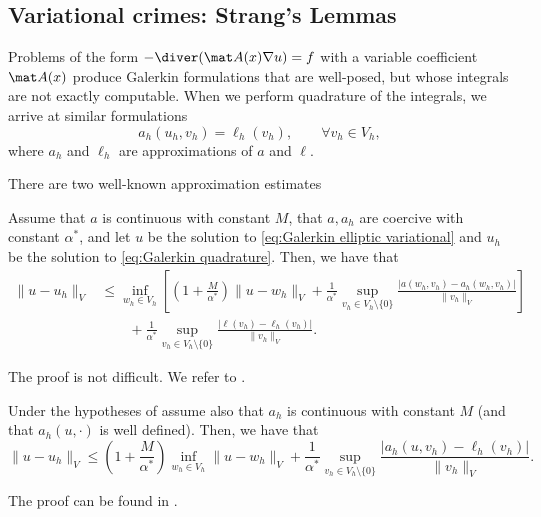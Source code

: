\subsection{Variational crimes: Strang's Lemmas}

Problems of the form $-\diver(\mat A(x)\nabla u)= f$ with a variable coefficient $\mat A(x)$ produce Galerkin formulations that are well-posed, but whose integrals are not exactly computable.
When we perform quadrature of the integrals, we arrive at similar formulations
\begin{equation}
    \label{eq:Galerkin quadrature}
    a_h(u_h,v_h) = \ell_h(v_h), \qquad \forall v_h \in V_h,
\end{equation}
where $a_h$ and $\ell_h$ are approximations of $a$ and $\ell$.

There are two well-known approximation estimates
\begin{lemma}
    \label{lem:Strang first lemma}
    Assume that $a$ is continuous with constant $M$, that $a, a_h$ are coercive with constant $\alpha^*$, and let $u$ be the solution to \eqref{eq:Galerkin elliptic variational} and $u_h$ be the solution to \eqref{eq:Galerkin quadrature}. Then, we have that
    \begin{align*}
        \| u - u_h \|_V
         & \le \inf_{w_h \in V_h} \left[
            \left( 1 + \frac{M}{\alpha^*}\right) \|u - w_h \|_V + \frac 1 {\alpha^*} \sup_{v_h \in V_h \setminus \{0\}} \frac{|a(w_h, v_h) - a_h(w_h,v_h)|}{\|v_h\|_V}
        \right]                                                                                      \\
         & \qquad + \frac 1 {\alpha^*} \sup_{v_h \in V_h \setminus \{0\}} \frac{|\ell(v_h) - \ell_h(v_h)|}{\|v_h\|_V}.
    \end{align*}
\end{lemma}
The proof is not difficult. We refer to \cite[Theorem 5.5.1]{QuarteroniValli1994}.
\begin{lemma}
    \label{lem:Strang second lemma}
    Under the hypotheses of 
    assume also that $a_h$ is continuous with constant $M$ (and that $a_h(u, \cdot)$ is well defined).
    Then, we have that
    \begin{equation}
        \|u - u_h\|_V \le \left( 1 + \frac{M}{\alpha^*} \right) \inf_{w_h \in V_h} \|u - w_h\|_V + \frac{1}{\alpha^*} \sup_{v_h \in V_h \setminus \{0\}} \frac{|a_h(u, v_h) - \ell_h (v_h)|}{\|v_h\|_V}.
    \end{equation}
\end{lemma}
The proof can be found in \cite[pp.~212--213]{ciarletHandbookNumericalAnalysis1990}.